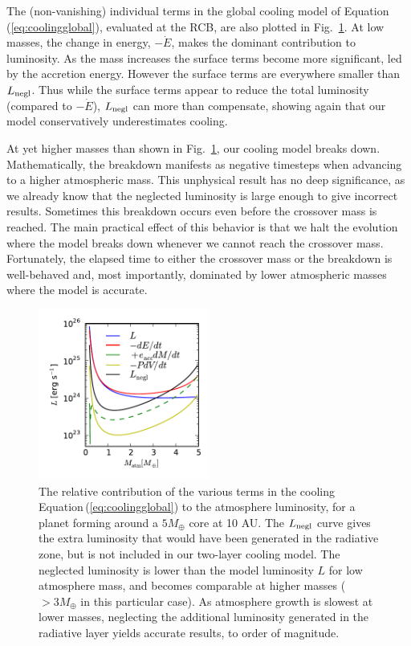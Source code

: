 \documentclass[apj, numberedappendix]{emulateapj}
\newcommand{\Eq}[1]{Equation\,(\ref{#1})}
\newcommand{\Fig}[1]{Fig.~\ref{#1}}
\begin{document}
The (non-vanishing) individual terms in the global cooling model of \Eq{eq:coolingglobal}, evaluated at the RCB, are also plotted in \Fig{fig:coolingterms}.  At low masses, the change in energy, $- \dot{E}$, makes the dominant contribution to luminosity.  As the mass increases the surface terms become more significant, led by the accretion energy.  However the surface terms are everywhere smaller than $L_{\rm negl}$.  Thus while the surface terms appear to reduce the total luminosity (compared to $-\dot{E}$), $L_{\rm negl}$ can more than compensate, showing again that our model conservatively underestimates cooling.

At yet higher masses than shown in \Fig{fig:coolingterms}, our cooling model breaks down.  Mathematically, the breakdown manifests as negative timesteps when advancing to a higher atmospheric mass.  This unphysical result has no deep significance, as we already know that the neglected luminosity is large enough to give incorrect results.  Sometimes this breakdown occurs even before the crossover mass is reached.  The main practical effect of this behavior is that we halt the evolution where the model breaks down whenever we cannot reach the crossover mass.   Fortunately, the elapsed time to either the crossover mass or the breakdown is well-behaved and, most importantly, dominated by lower atmospheric masses where the model is accurate.  

 
\begin{figure}[tb]
\centering
\includegraphics[width=0.5\textwidth]{../../figs/ModelAtmospheres/RadSelfGravPoly/PaperFigs/cooling_a10_Mc5_rcb_paper.pdf}
\caption{The relative contribution of the various terms in the cooling \Eq{eq:coolingglobal} to the atmosphere luminosity, for a planet forming around a $5 M_\oplus$ core at 10 AU. The $L_{\rm negl}$ curve gives the extra luminosity that would have been generated in the radiative zone, but is not included in our two-layer cooling model. The neglected luminosity is lower than the model luminosity $L$ for low atmosphere mass, and becomes comparable at higher masses ($>3 M_{\oplus}$ in this particular case). As atmosphere growth is slowest at lower masses, neglecting the additional luminosity generated in the radiative layer yields accurate results, to order of magnitude.}
\label{fig:coolingterms}
\end{figure}
\end{document}
